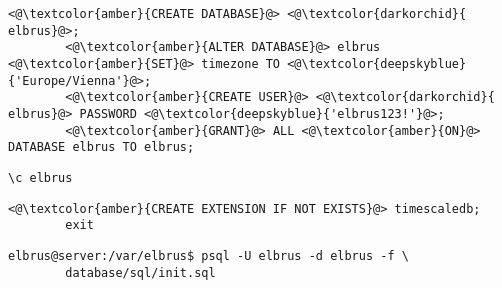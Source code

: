 	\lstset{style=files}
	\begin{lstlisting}[caption={Auführen von SQL Befehlen.}, numbers=none]
		<@\textcolor{amber}{CREATE DATABASE}@> <@\textcolor{darkorchid}{ elbrus}@>;
		<@\textcolor{amber}{ALTER DATABASE}@> elbrus <@\textcolor{amber}{SET}@> timezone TO <@\textcolor{deepskyblue}{'Europe/Vienna'}@>;
		<@\textcolor{amber}{CREATE USER}@> <@\textcolor{darkorchid}{ elbrus}@> PASSWORD <@\textcolor{deepskyblue}{'elbrus123!'}@>;
		<@\textcolor{amber}{GRANT}@> ALL <@\textcolor{amber}{ON}@> DATABASE elbrus TO elbrus;
	\end{lstlisting}
	
	\begin{lstlisting}[caption={Wechseln zu erstellter Datenbank.}, numbers=none]
		\c elbrus
	\end{lstlisting}
	
	\begin{lstlisting}[caption={Hinzufügen der TimescaleDB Erweiterung.}, numbers=none]
		<@\textcolor{amber}{CREATE EXTENSION IF NOT EXISTS}@> timescaledb;
		exit
	\end{lstlisting}
	
	\lstset{style=commands}
	\begin{lstlisting}[caption={Anlegen der benötigten Tabellen duch das ausführen von 'init.sql'.}]
		elbrus@server:/var/elbrus$ psql -U elbrus -d elbrus -f \
		database/sql/init.sql
	\end{lstlisting}
